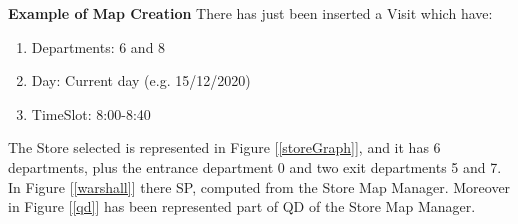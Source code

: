 \documentclass[a4paper, 12pt, oneside, table]{article}
\begin{document}
\vspace{0.4em}
\textbf{Example of Map Creation} \newline
\vspace{0.4em}
There has just been inserted a Visit which have:
\begin{enumerate}[label=-]
    \item Departments: 6 and 8
    \item Day: Current day (e.g. 15/12/2020)
    \item TimeSlot: 8:00-8:40
\end{enumerate}
The Store selected is represented in Figure [\ref{storeGraph}], and it has 6 departments, plus the entrance department 0 and two exit departments 5 and 7. \newline
In Figure [\ref{warshall}] there SP, computed from the Store Map Manager. Moreover in Figure [\ref{qd}] has been represented part of QD of the Store Map Manager.
\end{document}
